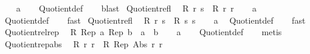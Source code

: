 \begin{isabellebody}
\isanewline
%
\isadelimproof
\ \ %
\endisadelimproof
%
\isatagproof
{}\isamarkupfalse%
\ a\isanewline
\ \ \isamarkupfalse%
\ Quotient{}{\isacharunderscore}{\kern0pt}def\isanewline
\ \ \isamarkupfalse%
\ blast%
\endisatagproof
{\isafoldproof}%
%
\isadelimproof
\isanewline
%
\endisadelimproof
\isanewline
{}\isamarkupfalse%
\ Quotient{}{\isacharunderscore}{\kern0pt}refl{}{\isacharcolon}{\kern0pt}\isanewline
\ \ {\isachardoublequoteopen}R\ r\ s\ {\isasymLongrightarrow}\ R\ r\ r{\isachardoublequoteclose}\isanewline
%
\isadelimproof
\ \ %
\endisadelimproof
%
\isatagproof
{}\isamarkupfalse%
\ a\ \isamarkupfalse%
\ Quotient{}{\isacharunderscore}{\kern0pt}def\isanewline
\ \ \isamarkupfalse%
\ fast%
\endisatagproof
{\isafoldproof}%
%
\isadelimproof
\isanewline
%
\endisadelimproof
\isanewline
{}\isamarkupfalse%
\ Quotient{}{\isacharunderscore}{\kern0pt}refl{}{\isacharcolon}{\kern0pt}\isanewline
\ \ {\isachardoublequoteopen}R\ r\ s\ {\isasymLongrightarrow}\ R\ s\ s{\isachardoublequoteclose}\isanewline
%
\isadelimproof
\ \ %
\endisadelimproof
%
\isatagproof
{}\isamarkupfalse%
\ a\ \isamarkupfalse%
\ Quotient{}{\isacharunderscore}{\kern0pt}def\isanewline
\ \ \isamarkupfalse%
\ fast%
\endisatagproof
{\isafoldproof}%
%
\isadelimproof
\isanewline
%
\endisadelimproof
\isanewline
{}\isamarkupfalse%
\ Quotient{}{\isacharunderscore}{\kern0pt}rel{\isacharunderscore}{\kern0pt}rep{\isacharcolon}{\kern0pt}\isanewline
\ \ {\isachardoublequoteopen}R\ {\isacharparenleft}{\kern0pt}Rep\ a{\isacharparenright}{\kern0pt}\ {\isacharparenleft}{\kern0pt}Rep\ b{\isacharparenright}{\kern0pt}\ {\isasymlongleftrightarrow}\ a\ {\isacharequal}{\kern0pt}\ b{\isachardoublequoteclose}\isanewline
%
\isadelimproof
\ \ %
\endisadelimproof
%
\isatagproof
{}\isamarkupfalse%
\ a\isanewline
\ \ \isamarkupfalse%
\ Quotient{}{\isacharunderscore}{\kern0pt}def\isanewline
\ \ \isamarkupfalse%
\ metis%
\endisatagproof
{\isafoldproof}%
%
\isadelimproof
\isanewline
%
\endisadelimproof
\isanewline
{}\isamarkupfalse%
\ Quotient{}{\isacharunderscore}{\kern0pt}rep{\isacharunderscore}{\kern0pt}abs{\isacharcolon}{\kern0pt}\isanewline
\ \ {\isachardoublequoteopen}R\ r\ r\ {\isasymLongrightarrow}\ R\ {\isacharparenleft}{\kern0pt}Rep\ {\isacharparenleft}{\kern0pt}Abs\ r{\isacharparenright}{\kern0pt}{\isacharparenright}{\kern0pt}\ r{\isachardoublequoteclose}\isanewline

\end{isabellebody}
